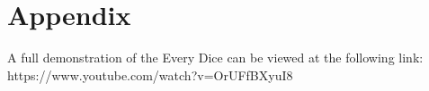 \documentclass{sigchi}
\begin{document}





\section{Appendix}

A full demonstration of the Every Dice can be viewed at the following link:  https://www.youtube.com/watch?v=OrUFfBXyuI8
\end{document}
